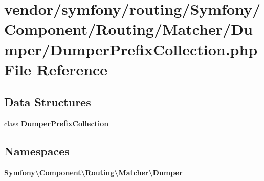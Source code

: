 \section{vendor/symfony/routing/\+Symfony/\+Component/\+Routing/\+Matcher/\+Dumper/\+Dumper\+Prefix\+Collection.php File Reference}
\label{_dumper_prefix_collection_8php}
\subsection*{Data Structures}
\begin{DoxyCompactItemize}
\item 
class {\bf Dumper\+Prefix\+Collection}
\end{DoxyCompactItemize}
\subsection*{Namespaces}
\begin{DoxyCompactItemize}
\item 
 {\bf Symfony\textbackslash{}\+Component\textbackslash{}\+Routing\textbackslash{}\+Matcher\textbackslash{}\+Dumper}
\end{DoxyCompactItemize}
